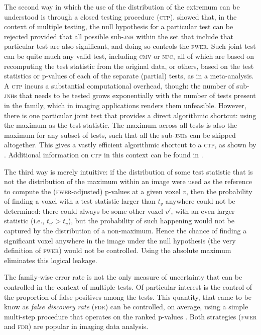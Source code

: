 The second way in which the use of the distribution of the extremum can be understood is through a closed testing procedure (\textsc{ctp}). \citet{Marcus1976} showed that, in the context of multiple testing, the null hypothesis for a particular test can be rejected provided that all possible sub-\textsc{jnh} within the set that include that particular test are also significant, and doing so controls the \textsc{fwer}. Such joint test can be quite much any valid test, including \textsc{cmv} or \textsc{npc}, all of which are based on recomputing the test statistic from the original data, or others, based on the test statistics or p-values of each of the separate (partial) tests, as in a meta-analysis. A \textsc{ctp} incurs a substantial computational overhead, though: the number of sub-\textsc{jnh}s that needs to be tested grows exponentially with the number of tests present in the family, which in imaging applications renders them unfeasible. However, there is one particular joint test that provides a direct algorithmic shortcut: using the maximum as the test statistic. The maximum across all tests is also the maximum for any subset of tests, such that all the sub-\textsc{jnh}s can be skipped altogether. This gives a vastly efficient algorithmic shortcut to a \textsc{ctp}, as shown by \citep{Westfall1993}. Additional information on \textsc{ctp} in this context can be found in \citet{Winkler2016_npc}.

The third way is merely intuitive: if the distribution of some test statistic that is not the distribution of the maximum within an image were used as the reference to compute the (\textsc{fwer}-adjusted) p-values at a given voxel $v$, then the probability of finding a voxel with a test statistic larger than $t_v$ anywhere could not be determined: there could always be some other voxel $v'$, with an even larger statistic (i.e., $t_{v'} > t_v$), but the probability of such happening would not be captured by the distribution of a non-maximum. Hence the chance of finding a significant voxel anywhere in the image under the null hypothesis (the very definition of \textsc{fwer}) would not be controlled. Using the absolute maximum eliminates this logical leakage.

The family-wise error rate is not the only measure of uncertainty that can be controlled in the context of multiple tests. Of particular interest is the control of the proportion of false positives among the tests. This quantity, that came to be know as \emph{false discovery rate} (\textsc{fdr}) can be controlled, on average, using a simple multi-step procedure that operates on the ranked p-values \citep{Benjamini1995;Genovese2002}. Both strategies (\textsc{fwer} and \textsc{fdr}) are popular in imaging data analysis.

